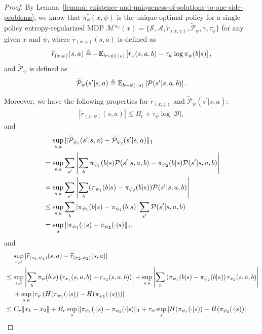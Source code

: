 \documentclass{article}
\theoremstyle{plain}
\theoremstyle{definition}
\theoremstyle{remark}
\def\E{\mathbb E}
\def\cA{\mathcal A}
\def\cB{\mathcal B}
\def\cM{\mathcal M}
\def\cP{\mathcal P}
\def\cS{\mathcal S}
\def\bydef{\triangleq}
\begin{document}
\begin{proof}
    By Lemma~\ref{lemma: existence-and-uniqueness-of-solutions-to-one-side-problems}, we know that $\pi_\phi^*(x,\psi)$ is the unique optimal policy for a single-policy entropy-regularized MDP $\cM^{\pi_\psi}(x) = \{\cS,\cA,\widetilde{r}_{(x,\psi)},\widetilde{\cP}_{\psi},\gamma,\tau_\phi\}$ for any given $x$ and $\psi$, where $\widetilde{r}_{(x,\psi)}(s,a)$ is defined as 
    \begin{align}
        \widetilde{r}_{(x,\psi)}(s,a) \bydef - \E_{b \sim \psi(\cdot|s)} \left[ r_x(s,a,b) -  \tau_\psi \log \pi_\psi(b|s) \right], \notag
    \end{align} 
    and $\widetilde{\cP}_{\psi}$ is defined as
    \begin{align}
        \widetilde{\cP}_\psi(s^\prime|s,a) \bydef \E_{b \sim \psi(\cdot|s)} \left[ \cP(s^\prime|s,a,b) \right]. \notag
    \end{align}
    
    Moreover, we have the following properties for $\widetilde{r}_{(x,\psi)}$ and $\widetilde{\cP}_\psi(s^\prime|s,a)$:
    \begin{align}
        |\widetilde{r}_{(x,\psi)}(s,a) | \leq B_r + \tau_\psi \log |\cB|,
    \end{align}
    and
    \begin{align}
        & \quad\, \sup_{s,a} \| \widetilde{\cP}_{\psi_1}(s^\prime|s,a) - \widetilde{\cP}_{\psi_2}(s^\prime|s,a)\|_1 \notag \\
        & = \sup_{s,a} \sum_{s^\prime} \left|\sum_b \pi_{\psi_1}(b|s) \cP(s^\prime|s,a,b) - \pi_{\psi_2}(b|s) \cP(s^\prime|s,a,b)\right| \notag\\
        & = \sup_{s,a} \sum_{s^\prime} \left|\sum_b (\pi_{\psi_1}(b|s) - \pi_{\psi_2}(b|s)) \cP(s^\prime|s,a,b)\right| \notag \\
        & \leq \sup_{s,a} \sum_b |\pi_{\psi_1}(b|s) - \pi_{\psi_2}(b|s)| \sum_{s^\prime} \cP(s^\prime|s,a,b) \notag \\
        & = \sup_{s}  \|\pi_{\psi_1}(\cdot|s) - \pi_{\psi_2}(\cdot|s)\|_1,
    \end{align}
    and
    \begin{align}
         & \quad \, \sup_{s,a} | \widetilde{r}_{(x_1,\psi_1)}(s,a) - \widetilde{r}_{(x_2,\psi_2)}(s,a) | \nonumber \\
         & \leq \sup_{s,a} \left|\sum_b \pi_{\psi}(b|s)\left(r_{x_1}(s,a,b) - r_{x_2}(s,a,b) \right) \right| + \sup_{s,a} \left| \sum_b \left(\pi_{\psi_1}(b|s) - \pi_{\psi_2}(b|s) \right)r_{x_2}(s,a,b) \right| \notag\\
         & \quad\; +   \sup_{s,a} \left| \tau_\psi\left(H(\pi_{\psi_1}(\cdot|s)) - H(\pi_{\psi_2}(\cdot|s)) \right) \right| \notag\\
        & \leq C_r\|x_1 - x_2 \| +  B_r \sup_{s} \| \pi_{\psi_1}(\cdot|s) - \pi_{\psi_2}(\cdot|s) \|_1 + \tau_\psi \sup_{s} |H(\pi_{\psi_1}(\cdot|s)) - H(\pi_{\psi_2}(\cdot|s)) |.
    \end{align}


\end{proof}
\end{document}

